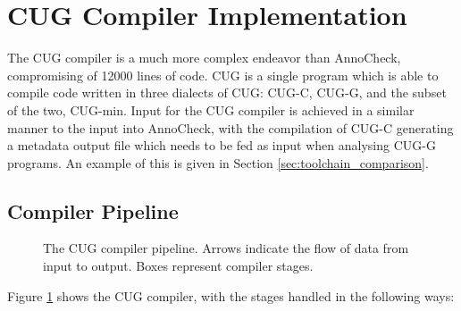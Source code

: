 \documentclass[a4paper,12pt,twoside,openright]{report}
\def\compilerloccount{12000 }
\begin{document}

\section{CUG Compiler Implementation}

The CUG compiler is a much more complex endeavor than AnnoCheck, compromising
of \compilerloccount lines of code. CUG is a single program which is able to
compile code written in three dialects of CUG: CUG-C, CUG-G, and the subset of
the two, CUG-min. Input for the CUG compiler is achieved in a similar manner to
the input into AnnoCheck, with the compilation of CUG-C generating a metadata
output file which needs to be fed as input when analysing CUG-G programs. An
example of this is given in Section \ref{sec:toolchain_comparison}.

\subsection{Compiler Pipeline}

\label{sec:compiler_pipeline}

\begin{figure}[h]
\centering
\def\svgwidth{\linewidth}
\scriptsize{}
\caption{The CUG compiler pipeline. Arrows indicate the flow of data from
input to output. Boxes represent compiler stages.}
\label{fig:cug_compiler_pipeline}
\end{figure}

Figure \ref{fig:cug_compiler_pipeline} shows the CUG compiler, with the
stages handled in the following ways:
\end{document}
